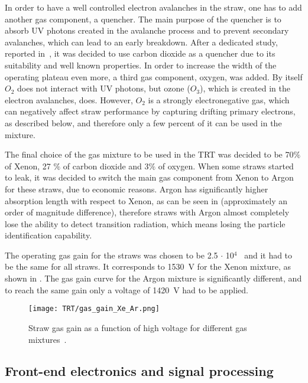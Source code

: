 In order to have a well controlled electron avalanches in the straw, one has to add another gas component, a quencher. The main purpose of the quencher is to absorb UV photons created in the avalanche process and to prevent secondary avalanches, which can lead to an early breakdown.
After a dedicated study, reported in~\cite{Abat:2008zza}, it was decided to use carbon dioxide as a quencher due to its suitability and well known properties.
In order to increase the width of the operating plateau even more, a third gas component, oxygen, was added.
By itself $O_2$ does not interact with UV photons, but ozone ($O_3$), which is created in the electron avalanches, does.
However, $O_2$ is a strongly electronegative gas, which can negatively affect straw performance by capturing drifting primary electrons, as described below,
and therefore only a few percent of it can be used in the mixture.
 
The final choice of the gas mixture to be used in the TRT was decided to be 70$\%$ of Xenon, 27 $\%$ of carbon dioxide and 3$\%$ of oxygen.
When some straws started to leak, it was decided to switch the main gas component from Xenon to Argon for these straws, due to economic reasons.
Argon has significantly higher absorption length with respect to Xenon, as can be seen in  (approximately an order of magnitude difference), 
therefore straws with Argon almost completely lose the ability to detect transition radiation, 
which means losing the particle identification capability.

The operating gas gain for the straws was chosen to be 2.5 $\cdot$ 10$^4$~\cite{ID_TDR_vol1} and it had to be the same for all straws. It corresponds to 1530~V for the Xenon mixture, as shown in .
The gas gain curve for the Argon mixture is significantly different, and to reach the same gain only a voltage of 1420~V had to be applied.

\begin{figure}
\centering
\texttt{[image: TRT/gas\_gain\_Xe\_Ar.png]}
\caption{ 
Straw gas gain as a function of high voltage for different gas mixtures~\cite{Abat:2008zza}.
}
\label{fig:gas_gain}
\end{figure}



\subsection{Front-end electronics and signal processing}
\label{subsubsec:front_end_electronics}

